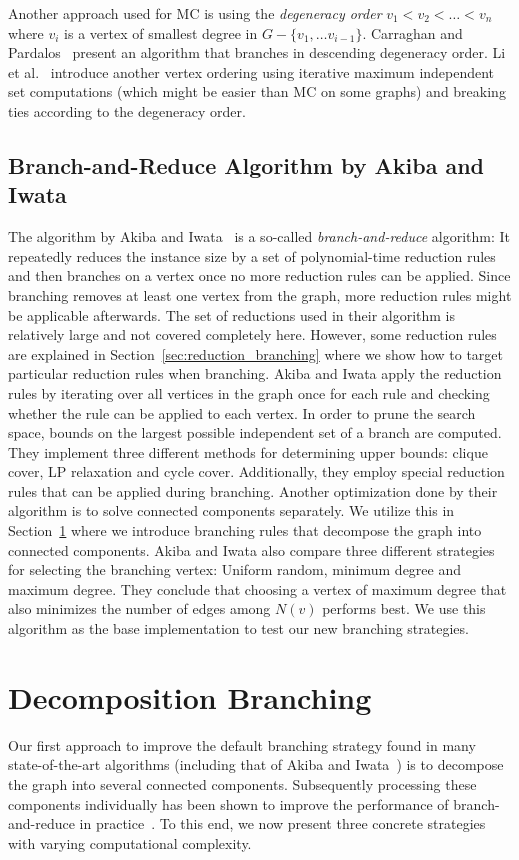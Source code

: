 \documentclass[a4paper,UKenglish,cleveref, autoref, thm-restate]{lipics-v2021}
\begin{document}
Another approach used for MC is using the \emph{degeneracy order} $v_1 < v_2 <
\dots < v_n$ where $v_i$ is a vertex of smallest degree in $G - \{v_1, \dots
v_{i-1}\}$. Carraghan and Pardalos~\cite{CarraghanPardalos} present an algorithm
that branches in descending degeneracy order. Li et al.~\cite{LiFangXu}
introduce another vertex ordering using iterative maximum independent set
computations (which might be easier than MC on some graphs) and breaking ties
according to the degeneracy order.

\subsection{Branch-and-Reduce Algorithm by Akiba and Iwata}

The algorithm by Akiba and Iwata~\cite{AkibaIwata} is a so-called
\emph{branch-and-reduce} algorithm: It repeatedly reduces the instance size by a
set of polynomial-time reduction rules and then branches on a vertex once no
more reduction rules can be applied. Since branching removes at least one vertex
from the graph, more reduction rules might be applicable afterwards. The
set of reductions used in their algorithm is relatively large and not covered
completely here. However, some reduction rules are explained in
Section~\ref{sec:reduction_branching} where we show how to target particular reduction
rules when branching. Akiba and Iwata apply the reduction rules by iterating over all
vertices in the graph once for each rule and checking whether the rule
can be applied to each vertex. In order to prune the search space, bounds on the largest
possible independent set of a branch are computed. They implement three different
methods for determining upper bounds: clique cover, LP relaxation and cycle
cover. Additionally, they employ special reduction rules that can be applied
during branching. Another optimization done by their algorithm is to solve
connected components separately. We utilize this in
Section~\ref{sec:decomposition_branching} where we introduce branching rules
that decompose the graph into connected components. Akiba and Iwata also
compare three different strategies for
selecting the branching vertex: Uniform random, minimum degree and maximum
degree. They conclude that choosing a vertex of maximum degree that also
minimizes the number of edges among $N(v)$ performs best. We use this algorithm
as the base implementation to test our new branching strategies.

\section{Decomposition Branching}
\label{sec:decomposition_branching}
Our first approach to improve the default branching strategy found in many state-of-the-art algorithms (including that of Akiba and Iwata~\cite{AkibaIwata}) is to decompose the graph into several connected components.
Subsequently processing these components individually has been shown to improve the performance of branch-and-reduce in practice~\cite{alsahafy2020computing}.
To this end, we now present three concrete strategies with varying computational complexity.
\end{document}
